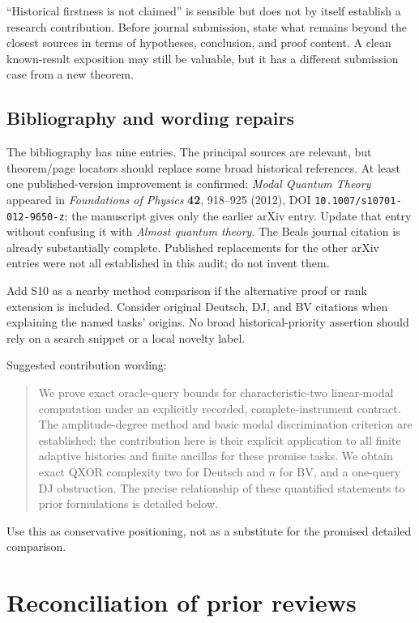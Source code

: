 \documentclass[
  11pt,
]{article}
\begin{document}
``Historical firstness is not claimed'' is sensible but does not by
itself establish a research contribution. Before journal submission,
state what remains beyond the closest sources in terms of hypotheses,
conclusion, and proof content. A clean known-result exposition may still
be valuable, but it has a different submission case from a new theorem.

\subsection{Bibliography and wording
repairs}\label{bibliography-and-wording-repairs}

The bibliography has nine entries. The principal sources are relevant,
but theorem/page locators should replace some broad historical
references. At least one published-version improvement is confirmed:
\emph{Modal Quantum Theory} appeared in \emph{Foundations of Physics}
\textbf{42}, 918--925 (2012), DOI \nolinkurl{10.1007/s10701-012-9650-z};
the manuscript gives only the earlier arXiv entry. Update that entry
without confusing it with \emph{Almost quantum theory}. The Beals
journal citation is already substantially complete. Published
replacements for the other arXiv entries were not all established in
this audit; do not invent them.

Add S10 as a nearby method comparison if the alternative proof or rank
extension is included. Consider original Deutsch, DJ, and BV citations
when explaining the named tasks' origins. No broad historical-priority
assertion should rely on a search snippet or a local novelty label.

Suggested contribution wording:

\begin{quote}
We prove exact oracle-query bounds for characteristic-two linear-modal
computation under an explicitly recorded, complete-instrument contract.
The amplitude-degree method and basic modal discrimination criterion are
established; the contribution here is their explicit application to all
finite adaptive histories and finite ancillas for these promise tasks.
We obtain exact QXOR complexity two for Deutsch and \(n\) for BV, and a
one-query DJ obstruction. The precise relationship of these quantified
statements to prior formulations is detailed below.
\end{quote}

Use this as conservative positioning, not as a substitute for the
promised detailed comparison.

\section{Reconciliation of prior
reviews}\label{reconciliation-of-prior-reviews}
\end{document}
